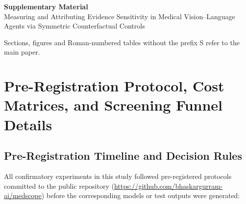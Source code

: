 \documentclass[10pt]{article}
\begin{document}
\begin{center}{\Large\bfseries Supplementary Material}\\[4pt]
{\large Measuring and Attributing Evidence Sensitivity in Medical Vision--Language Agents via Symmetric Counterfactual Controls}\end{center}
\noindent Sections, figures and Roman-numbered tables without the prefix S refer to the main paper.



\section{Pre-Registration Protocol, Cost Matrices, and Screening Funnel Details}
\label{app:prereg_and_funnel}

\subsection{Pre-Registration Timeline and Decision Rules}
All confirmatory experiments in this study followed pre-registered protocols committed to the public repository (\url{https://github.com/bhaskargurram-ai/medscope}) before the corresponding models or test outputs were generated:
\end{document}

